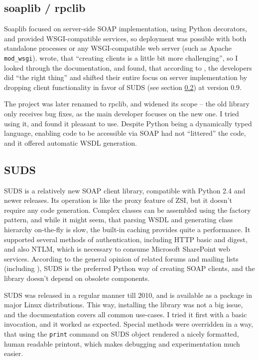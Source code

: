 \subsection{soaplib / rpclib}

Soaplib focused on server-side SOAP implementation, using Python decorators, and provided WSGI-compatible services, so deployment was possible with both standalone processes or any WSGI-compatible web server (such as Apache \verb|mod_wsgi|). \cite{so-206154} wrote, that ``creating clients is a little bit more challenging'', so I looked through the documentation, and found, that according to \cite{soaplib2-changelog}, the developers did ``the right thing'' and shifted their entire focus on server implementation by dropping client functionality in favor of SUDS (see section \ref{suds}) at version 0.9.

The project was later renamed to rpclib, and widened its scope -- the old library only receives bug fixes, as the main developer focuses on the new one. I tried using it, and found it pleasant to use. Despite Python being a dynamically typed language, enabling code to be accessible via SOAP had not ``littered'' the code, and it offered automatic WSDL generation.

\subsection{SUDS}
\label{suds}

SUDS is a relatively new SOAP client library, compatible with Python 2.4 and newer releases. Its operation is like the proxy feature of ZSI, but it doesn't require any code generation. Complex classes can be assembled using the factory pattern, and while it might seem, that parsing WSDL and generating class hierarchy on-the-fly is slow, the built-in caching provides quite a performance. It supported several methods of authentication, including HTTP basic and digest, and also NTLM, which is necessary to consume Microsoft SharePoint web services. According to the general opinion of related forums and mailing lists (including \cite{so-206154}), SUDS is the preferred Python way of creating SOAP clients, and the library doesn't depend on obsolete components.

SUDS was released in a regular manner till 2010, and is available as a package in major Linux distributions. This way, installing the library was not a big issue, and the documentation \cite{suds-doc} covers all common use-cases. I tried it first with a basic invocation, and it worked as expected. Special methods were overridden in a way, that using the \verb|print| command on SUDS object rendered a nicely formatted, human readable printout, which makes debugging and experimentation much easier.

